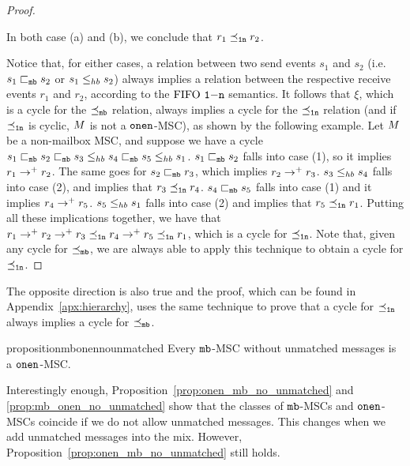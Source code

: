 \begin{proof}
\begin{enumerate}
\begin{enumerate}
	\end{enumerate}
	In both case (a) and (b), we conclude that $r_1 \preceq_{\mathtt{1n}} r_2$. %
\end{enumerate}
Notice that, for either cases, a relation between two send events $s_1$ and $s_2$ (i.e. $s_1 \sqsubset_{\mathtt{mb}} s_2$ or $s_1 \leq_{hb} s_2$) always implies a relation between the respective receive events $r_1$ and $r_2$, according to the $\text{FIFO } \mathtt{1\mathsf{-}n}$ semantics. It follows that $\xi$, which is a cycle for the $\preceq_{\mathtt{mb}}$ relation, always implies a cycle for the $\preceq_{\mathtt{1n}}$ relation (and if $\preceq_{\mathtt{1n}}$ is cyclic, $M$ is not a $\mathtt{onen}$-MSC), as shown by the following example. Let $M$ be a non-mailbox MSC, and suppose we have a cycle $s_1 \sqsubset_{\mathtt{mb}} s_2 \sqsubset_{\mathtt{mb}} s_3 \leq_{hb} s_4 \sqsubset_{\mathtt{mb}} s_5 \leq_{hb} s_1$. $s_1 \sqsubset_{\mathtt{mb}} s_2$ falls into case (1), so it implies $r_1 \to^+ r_2$. The same goes for $s_2 \sqsubset_{\mathtt{mb}} r_3$, which implies $r_2 \to^+ r_3$. $s_3 \leq_{hb} s_4$ falls into case (2), and implies that $r_3 \preceq_{\mathtt{1n}} r_4$. $s_4 \sqsubset_{\mathtt{mb}} s_5$ falls into case (1) and it implies $r_4 \to^+ r_5$. $s_5 \leq_{hb} s_1$ falls into case (2) and implies that $r_5 \preceq_{\mathtt{1n}} r_1$. Putting all these implications together, we have that $r_1 \to^+ r_2 \to^+ r_3 \preceq_{\mathtt{1n}} r_4 \to^+ r_5 \preceq_{\mathtt{1n}} r_1$, which is a cycle for $\preceq_{\mathtt{1n}}$. Note that, given any cycle for $\preceq_{\mathtt{mb}}$, we are always able to apply this technique to obtain a cycle for $\preceq_{\mathtt{1n}}$.
\end{proof}

The opposite direction is also true and the proof, which can be found in  Appendix~\ref{apx:hierarchy}, uses the same technique to prove that a cycle for $\preceq_{\mathtt{1n}}$ always implies a cycle for $\preceq_{\mathtt{mb}}$.

\begin{restatable}{proposition}{mbonennounmatched} 
\label{prop:mb_onen_no_unmatched}
	Every $\mathtt{mb}$-MSC without unmatched messages is a $\mathtt{onen}$-MSC.
\end{restatable}

Interestingly enough, Proposition~\ref{prop:onen_mb_no_unmatched} and \ref{prop:mb_onen_no_unmatched} show that the classes of $\mathtt{mb}$-MSCs and $\mathtt{onen}$-MSCs coincide if we do not allow unmatched messages.  This changes when we add unmatched messages into the mix. However, Proposition~\ref{prop:onen_mb_no_unmatched} still holds.

